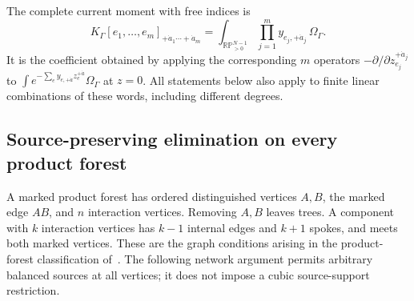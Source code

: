 The complete current moment with free indices is
\begin{equation}
 K_\Gamma[e_1,\ldots,e_m]_{+\dot a_1\cdots+\dot a_m}
 =\int_{\mathbb{RP}^{N-1}_{>0}}
       \prod_{j=1}^m y_{e_j,+\dot a_j}\,\Omega_\Gamma.
 \label{networks:moment}
\end{equation}
It is the coefficient obtained by applying the corresponding $m$ operators
$-\partial/\partial z_{e_j}^{+\dot a_j}$ to
$\int e^{-\sum_e y_{e,+\dot a}z_e^{+\dot a}}\Omega_\Gamma$ at $z=0$.
All statements below also apply to finite linear combinations of these
words, including different degrees.

\subsection{Source-preserving elimination on every product forest}
\label{networks:elimination}

A marked product forest has ordered distinguished vertices $A,B$, the
marked edge $AB$, and $n$ interaction vertices.  Removing $A,B$ leaves
trees.  A component with $k$ interaction vertices has $k-1$ internal edges
and $k+1$ spokes, and meets both marked vertices.  These are the graph
conditions arising in the product-forest classification of~\cite{li2026}.
The following network argument permits arbitrary balanced sources at all
vertices; it does not impose a cubic source-support restriction.

